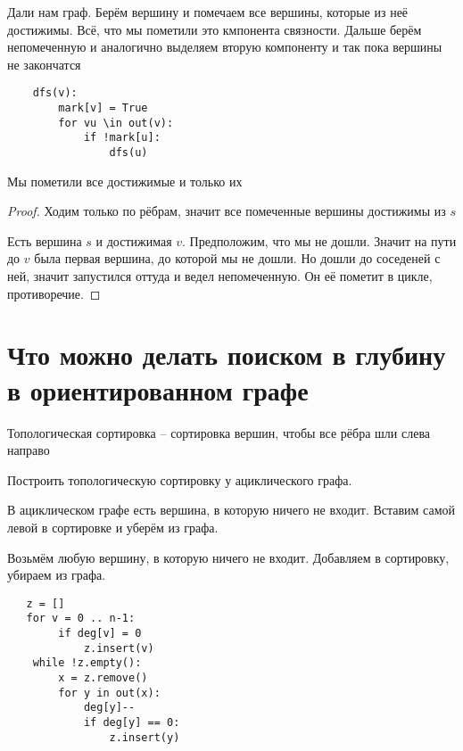 \documentclass{book}
\theoremstyle{definition}
\begin{document}
\begin{definition}

    Дали нам граф. Берём вершину и помечаем все вершины, которые из неё достижимы. Всё, что мы пометили это кмпонента связности. Дальше берём непомеченную и аналогично выделяем вторую компоненту и так пока вершины не закончатся
\end{definition}

\begin{lstlisting}
    dfs(v):
        mark[v] = True
        for vu \in out(v):
            if !mark[u]:
                dfs(u)
\end{lstlisting}    
\begin{lemma}
    Мы пометили все достижимые и только их
\end{lemma}
\begin{proof}
    Ходим только по рёбрам, значит все помеченные вершины достижимы из $s$

    Есть вершина  $s$ и достижимая $v$. Предположим, что мы не дошли. Значит на пути до  $v$ была первая вершина, до которой мы не дошли. Но дошли до соседеней с ней, значит запустился оттуда и ведел непомеченную. Он её пометит в цикле, противоречие.
\end{proof}

\section{Что можно делать поиском в глубину в ориентированном графе}

\begin{definition}
    Топологическая сортировка -- сортировка вершин, чтобы все рёбра шли слева направо
\end{definition}

\begin{problem}
    Построить топологическую сортировку у ациклического графа.
\end{problem}
\begin{problem}
    В ациклическом графе есть вершина, в которую ничего не входит. Вставим самой левой в сортировке и уберём из графа.

    Возьмём любую вершину, в которую ничего не входит. Добавляем в сортировку, убираем из графа.
\end{problem}

\begin{lstlisting}
   z = []
   for v = 0 .. n-1:
        if deg[v] = 0
            z.insert(v)
    while !z.empty():
        x = z.remove()
        for y in out(x):
            deg[y]--
            if deg[y] == 0:
                z.insert(y)

\end{lstlisting}
\end{document}
